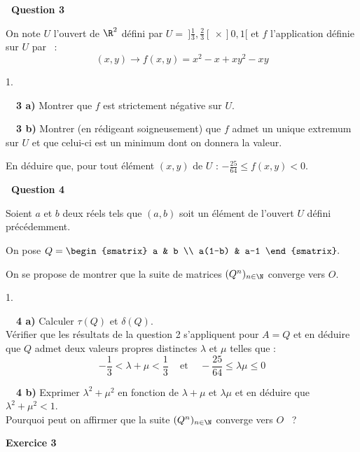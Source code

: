 \documentclass[11pt]{article}%
\begin{document}
\textbf{\ Question 3}

On note $U$ l'ouvert de $\R^{2}$ défini par $ U = \ ]\frac{1}{ 3},
\frac{2}{ 3 }[ \ \times ]0,1[$ et $f$ l'application définie sur $U$
par~ : 
\[
(x,y) \rightarrow f(x,y) = x^{2}-x + x y^{2}-xy
\]

\begin{noliste}{1.}
 \setlength{\itemsep}{4mm}
\item[ \ \textbf{\ 3 a)}] Montrer que $f$ est strictement négative sur
$U$.

\item[ \ \textbf{\ 3 b)}] Montrer (en rédigeant soigneusement) que $f$
admet
un unique extremum sur $U$ et que celui-ci est un minimum dont on
donnera la
valeur.

En déduire que, pour tout élément $(x,y)$ de $U$ : $ -\frac{25}{64}
\leq f(x,y) <0$.
\end{noliste}

\textbf{\ Question 4}

Soient $a$ et $b$ deux réels tels que $(a,b)$ soit un élément de
l'ouvert $U$ défini précédemment.

On pose $Q = 
\begin{smatrix}
a & b \\
a(1-b) & a-1
\end{smatrix}.$

On se propose de montrer que la suite de matrices $(Q^{n})_{n \in \N}$
converge vers $O$.

\begin{noliste}{1.}
 \setlength{\itemsep}{4mm}
\item[ \ \textbf{\ 4 a)}] Calculer $\tau(Q)$ et $\delta(Q).$\\
Vérifier que les résultats de la question 2 s'appliquent pour $A = Q$
et
en déduire que $Q$ admet deux valeurs propres distinctes $\lambda$ et
$\mu$
telles que : 
\[
-\frac{1}{3} < \lambda + \mu < \frac{1}{3} \;\;\;\text{ et } \;\;\;
-\frac{25}{64} \leq \lambda \mu \leq 0
\]

\item[ \ \textbf{\ 4 b)}] Exprimer $\lambda^{2} + \mu^{2}$ en fonction
de $\lambda + \mu
$ et $\lambda \mu$ et en déduire que $\lambda^{2} + \mu^{2} <1$.\\
Pourquoi peut on affirmer que la suite $(Q^{n})_{n \in \N}$ converge
vers $O$~ ?
\end{noliste}



\begin{center}
\textbf{\large Exercice 3 }
\end{center}
\end{document}

